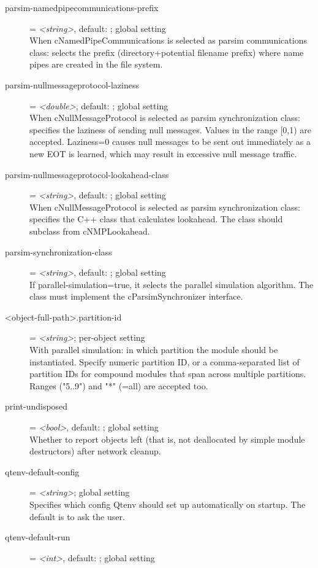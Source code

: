 \begin{description}
\item[parsim-namedpipecommunications-prefix] = \textit{<string>}, default: ; global setting \\
    When cNamedPipeCommunications is selected as parsim communications class:
    selects the prefix (directory+potential filename prefix) where name pipes
    are created in the file system.
\item[parsim-nullmessageprotocol-laziness] = \textit{<double>}, default: ; global setting \\
    When cNullMessageProtocol is selected as parsim synchronization class:
    specifies the laziness of sending null messages. Values in the range [0,1)
    are accepted. Laziness=0 causes null messages to be sent out immediately as
    a new EOT is learned, which may result in excessive null message traffic.
\item[parsim-nullmessageprotocol-lookahead-class] = \textit{<string>}, default: ; global setting \\
    When cNullMessageProtocol is selected as parsim synchronization class:
    specifies the C++ class that calculates lookahead. The class should
    subclass from cNMPLookahead.
\item[parsim-synchronization-class] = \textit{<string>}, default: ; global setting \\
    If parallel-simulation=true, it selects the parallel simulation algorithm.
    The class must implement the cParsimSynchronizer interface.
\item[<object-full-path>.partition-id] = \textit{<string>}; per-object setting \\
    With parallel simulation: in which partition the module should be
    instantiated. Specify numeric partition ID, or a comma-separated list of
    partition IDs for compound modules that span across multiple partitions.
    Ranges ("5..9") and "*" (=all) are accepted too.
\item[print-undisposed] = \textit{<bool>}, default: ; global setting \\
    Whether to report objects left (that is, not deallocated by simple module
    destructors) after network cleanup.
\item[qtenv-default-config] = \textit{<string>}; global setting \\
    Specifies which config Qtenv should set up automatically on startup. The
    default is to ask the user.
\item[qtenv-default-run] = \textit{<int>}, default: ; global setting \\

\end{description}
